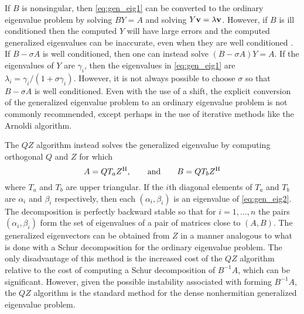 \documentclass[12pt]{article}
\def\eqand{\qquad\mbox{and}\qquad}
\def\vec#1{{\bf #1}}
\def\H{{\rm H}}
\begin{document}
If $B$ is nonsingular, then \eqref{eq:gen_eig1} can be converted to
the ordinary eigenvalue problem by solving $BY = A$ and solving
$Y \vec{v} = \lambda \vec{v}$.  However, if $B$ is ill conditioned
then the computed $Y$ will have large errors and the computed
generalized eigenvalues can be inaccurate, even when they are well
conditioned \cite{govl:13, stew:01}.  If $B-\sigma A$ is well
conditioned, then one can instead solve $(B-\sigma A) Y = A$.  If the
eigenvalues of $Y$ are $\gamma_i$, then the eigenvalues in
\eqref{eq:gen_eig1} are $\lambda_i = \gamma_i/(1+\sigma\gamma_i)$.
However, it is not always possible to choose $\sigma$ so that
$B-\sigma A$ is well conditioned.  Even with the use of a shift, the
explicit conversion of the generalized eigenvalue problem to an
ordinary eigenvalue problem is not commonly recommended, except
perhaps in the use of iterative methods like the Arnoldi algorithm.

The $QZ$ algorithm \cite{most:73} instead solves the generalized
eigenvalue by computing orthogonal $Q$ and $Z$ for which
\begin{equation*}
  A = Q T_a Z^\H, \eqand B = QT_b Z^\H
\end{equation*}
where $T_a$ and $T_b$ are upper triangular.  If the $i$th diagonal
elements of $T_a$ and $T_b$ are $\alpha_i$ and $\beta_i$ respectively,
then each $(\alpha_i, \beta_i)$ is an eigenvalue of
\eqref{eq:gen_eig2}.  The decomposition is perfectly backward stable
so that for $i=1,\ldots, n$ the pairs $(\alpha_i, \beta_i)$ form the
set of eigenvalues of a pair of matrices close to $(A,B)$.  The
generalized eigenvectors can be obtained from $Z$ in a manner
analogous to what is done with a Schur decomposition for the ordinary
eigenvalue problem.  The only disadvantage of this method is the
increased cost of the $QZ$ algorithm relative to the cost of computing
a Schur decomposition of $B^{-1}A$, which can be significant.
However, given the possible instability associated with forming
$B^{-1}A$, the $QZ$ algorithm is the standard method for the dense
nonhermitian generalized eigenvalue problem.
\end{document}
